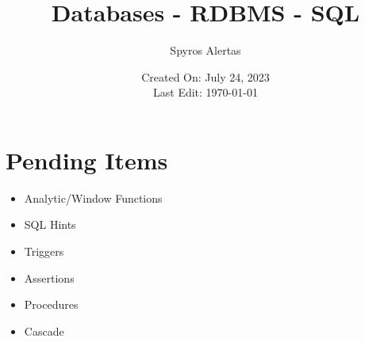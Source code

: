 \documentclass{article}
\title{\bfseries{Databases - RDBMS - SQL}}
\author{Spyros Alertas}
\date{Created On: July 24, 2023\\Last Edit: \today}
\begin{document}
\begin{titlingpage}
\maketitle
\end{titlingpage}


\tableofcontents





















\newpage
\section{Pending Items}
\begin{itemize}
	\item Analytic/Window Functions
	\item SQL Hints
	\item Triggers
	\item Assertions
	\item Procedures
	\item Cascade
\end{itemize}
\end{document}
